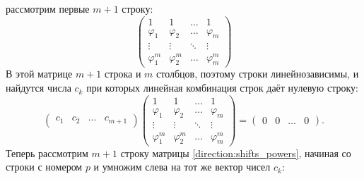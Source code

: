 рассмотрим первые $m+1$ строку:
\[
    \begin{pmatrix}
        1           & 1           & \dots  & 1           \\
        \varphi_1   & \varphi_2   & \dots  & \varphi_m   \\
        \vdots      & \vdots      & \ddots & \vdots      \\
        \varphi_1^m & \varphi_2^m & \dots  & \varphi_m^m
    \end{pmatrix}
\]
В этой матрице $m+1$ строка и $m$ столбцов, поэтому строки линейнозависимы, и найдутся числа $c_k$ при которых линейная комбинация строк даёт нулевую
строку:
\[
    \begin{pmatrix}
        c_1 & c_2 & \dots & c_{m+1}
    \end{pmatrix}
    \begin{pmatrix}
        1           & 1           & \dots  & 1           \\
        \varphi_1   & \varphi_2   & \dots  & \varphi_m   \\
        \vdots      & \vdots      & \ddots & \vdots      \\
        \varphi_1^m & \varphi_2^m & \dots  & \varphi_m^m
    \end{pmatrix}
    = \begin{pmatrix}
        0 & 0 & \dots & 0
    \end{pmatrix}
    .
\]
Теперь рассмотрим $m+1$ строку матрицы \eqref{direction:shifts_powers}, начиная со строки с номером $p$ и умножим слева на тот же вектор чисел $c_k$:
